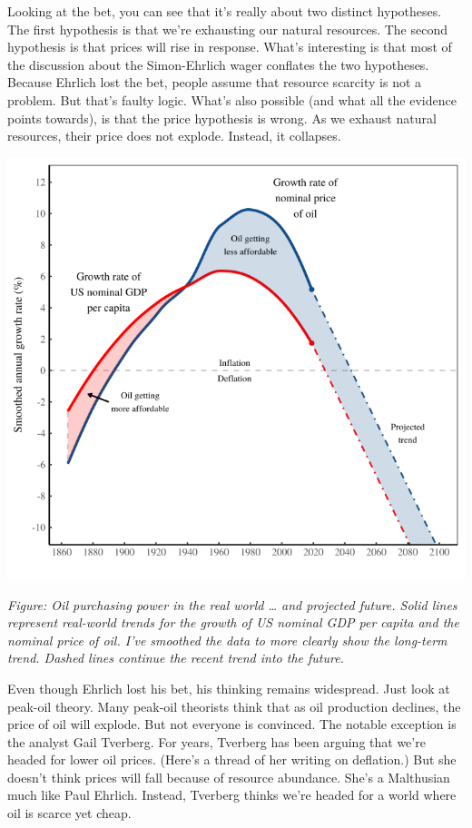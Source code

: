 \documentclass[
]{book}
\begin{document}
Looking at the bet, you can see that it's really about two distinct hypotheses. The first hypothesis is that we're exhausting our natural resources. The second hypothesis is that prices will rise in response. What's interesting is that most of the discussion about the Simon-Ehrlich wager conflates the two hypotheses. Because Ehrlich lost the bet, people assume that resource scarcity is not a problem. But that's faulty logic. What's also possible (and what all the evidence points towards), is that the price hypothesis is wrong. As we exhaust natural resources, their price does not explode. Instead, it collapses.

\includegraphics{fig/oil_purchasing_power.png}

\emph{Figure: Oil purchasing power in the real world \ldots{} and projected future. Solid lines represent real-world trends for the growth of US nominal GDP per capita and the nominal price of oil. I've smoothed the data to more clearly show the long-term trend. Dashed lines continue the recent trend into the future. }

Even though Ehrlich lost his bet, his thinking remains widespread. Just look at peak-oil theory. Many peak-oil theorists think that as oil production declines, the price of oil will explode. But not everyone is convinced. The notable exception is the analyst Gail Tverberg. For years, Tverberg has been arguing that we're headed for lower oil prices. (Here's a thread of her writing on deflation.) But she doesn't think prices will fall because of resource abundance. She's a Malthusian much like Paul Ehrlich. Instead, Tverberg thinks we're headed for a world where oil is scarce yet cheap.
\end{document}
